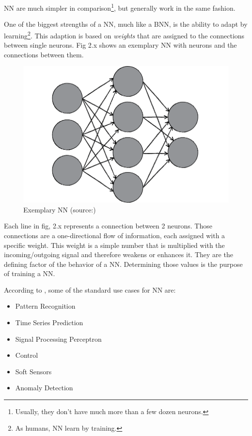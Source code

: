 NN are much simpler in comparison\footnote{Usually, they don't have much more than a few dozen neurons\cite{Bourg04}.}, but generally work in the same fashion.

One of the biggest strengths of a NN, much like a BNN, is the ability to adapt by learning\footnote{As humans, NN learn by training\cite{Shiffman12}.}. This adaption is based on \emph{weights} that are assigned to the connections between single neurons. Fig 2.x shows an exemplary NN with neurons and the connections between them.

\begin{figure}[H]
	\begin{center}
		\includegraphics[scale=1.0]{img/NN.png}
		\caption{Exemplary NN (source:\cite{Shiffman12})}
		\label{fig:fig2.3}
	\end{center}
\end{figure}

Each line in fig, 2.x represents a connection between 2 neurons. Those connections are a one-directional flow of information, each assigned with a specific weight. This weight is a simple number that is multiplied with the incoming/outgoing signal and therefore weakens or enhances it. They are the defining factor of the behavior of a NN. Determining those values is the purpose of training a NN\cite{Bourg04}.

According to \cite{Shiffman12}, some of the standard use cases for NN are:

\begin{itemize}
	\item Pattern Recognition
	\item Time Series Prediction
	\item Signal Processing Perceptron
	\item Control
	\item Soft Sensors
	\item Anomaly Detection
\end{itemize}


